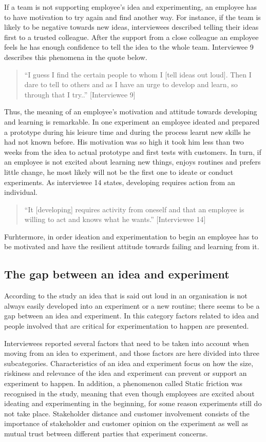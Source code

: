 If a team is not supporting employee's idea and experimenting, an employee has to have motivation to try again and find another way. For instance, if the team is likely to be negative towards new ideas, interviewees described telling their ideas first to a trusted colleague. After the support from a close colleague an employee feels he has enough confidence to tell the idea to the whole team. Interviewee 9 describes this phenomena in the quote below. 
\begin{quote}
``I guess I find the certain people to whom I [tell ideas out loud]. Then I dare to tell to others and as I have an urge to develop and learn, so through that I try..'' [Interviewee 9]
\end{quote}
Thus, the meaning of an employee's motivation and attitude towards developing and learning is remarkable. In one experiment an employee ideated and prepared a prototype during his leisure time and during the process learnt new skills he had not known before. His motivation was so high it took him less than two weeks from the idea to actual prototype and first tests with customers. In turn, if an employee is not excited about learning new things, enjoys routines and prefers little change, he most likely will not be the first one to ideate or conduct experiments. As interviewee 14 states, developing requires action from an individual. 
\begin{quote}
 ``It [developing] requires activity from oneself and that an employee is willing to act and knows what he wants.'' [Interviewee 14]
\end{quote}
Furhtermore, in order ideation and experimentation to begin an employee has to be motivated and have the resilient attitude towards failing and learning from it. 

\subsection{The gap between an idea and experiment}
According to the study an idea that is said out loud in an organisation is not always easily developed into an experiment or a new routine; there seems to be a gap between an idea and experiment.  In this category factors related to idea and people involved that are critical for experimentation to happen are presented.

Interviewees reported several factors that need to be taken into account when moving from an idea to experiment, and those factors are here divided into three subcategories. Characteristics of an idea and experiment focus on how the size, riskiness and relevance of the idea and experiment can prevent or support an experiment to happen. In addition, a phenomenon called Static friction was recognised in the study, meaning that even though employees are excited about ideating and experimenting in the beginning, for some reason experiments still do not take place. Stakeholder distance and customer involvement consists of the importance of stakeholder and customer opinion on the experiment as well as mutual trust between different parties that experiment concerns. 

